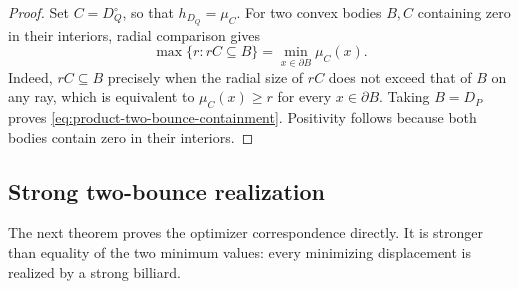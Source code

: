 \begin{unverified}
\begin{proof}
Set \(C=D_Q^\circ\), so that \(h_{D_Q}=\mu_C\).  For two convex bodies
\(B,C\) containing zero in their interiors, radial comparison gives
\[
 \max\{r:rC\subseteq B\}=\min_{x\in\partial B}\mu_C(x).
\]
Indeed, \(rC\subseteq B\) precisely when the radial size of \(rC\) does not
exceed that of \(B\) on any ray, which is equivalent to
\(\mu_C(x)\geq r\) for every \(x\in\partial B\).
Taking \(B=D_P\) proves \eqref{eq:product-two-bounce-containment}.
Positivity follows because both bodies contain zero in their interiors.
\end{proof}
\end{unverified}

\subsection{Strong two-bounce realization}
\label{subsec:product-two-bounce-strong-realization}

The next theorem proves the optimizer correspondence directly.  It is
stronger than equality of the two minimum values: every minimizing
displacement is realized by a strong billiard.

